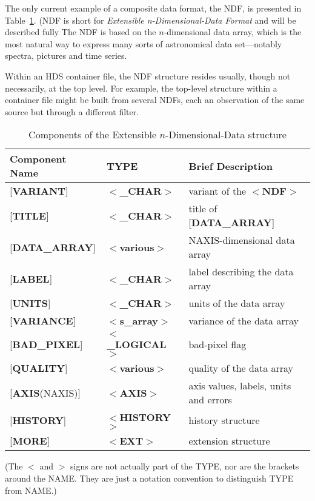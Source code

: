 The only current example of a composite data format,
the NDF, is presented in
Table~\ref{ta:example1}.  (NDF is
short for {\it Extensible n-Dimensional-Data Format} and will
be described fully
  The NDF
is based on the $n$-dimensional data array, which is the most natural
way to express many sorts of astronomical data set---notably
spectra, pictures and time series.

Within an HDS container file, the NDF structure resides usually,
though not necessarily, at the top level.  For example, the top-level
structure within a container file might be built from several NDFs,
each an observation of the same source but through a different filter.

\begin{table}[htb]
\centering
\caption{Components of the Extensible $n$-Dimensional-Data
structure}
\label{ta:example1}
\begin{tabular}{|l|l|l|}
\hline
Component Name & TYPE & Brief Description \\ \hline
{[}{\bf VARIANT}{]} & $<${\bf \_CHAR}$>$ & variant of the $<${\bf NDF}$>$ \\
{[}{\bf TITLE}{]} & $<${\bf \_CHAR}$>$ & title of {[}{\bf DATA\_ARRAY}{]} \\
{[}{\bf DATA\_ARRAY}{]} & $<${\bf various}$>$ & NAXIS-dimensional data array \\
{[}{\bf LABEL}{]} & $<${\bf \_CHAR}$>$ & label describing the data array \\
{[}{\bf UNITS}{]} & $<${\bf \_CHAR}$>$ & units of the data array \\
{[}{\bf VARIANCE}{]} & $<${\bf s\_array}$>$ & variance of the data array \\
{[}{\bf BAD\_PIXEL}{]} & $<${\bf \_LOGICAL}$>$ & bad-pixel flag \\
{[}{\bf QUALITY}{]} & $<${\bf various}$>$ & quality of the data array \\
{[}{\bf AXIS}(NAXIS){]} & $<${\bf AXIS}$>$ & axis values, labels, units and errors \\
{[}{\bf HISTORY}{]} & $<${\bf HISTORY}$>$ & history structure \\ 
{[}{\bf MORE}{]} & $<${\bf EXT}$>$ & extension structure \\ \hline
\end{tabular}
\end{table}

(The $<$ and $>$ signs
are not actually part of the TYPE, 
nor are the brackets around the NAME.  They are
just a notation convention
to distinguish TYPE from NAME.)

